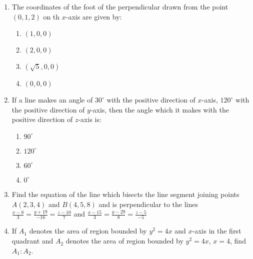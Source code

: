 \documentclass{article}
\begin{document}
\begin{enumerate}
	\item The coordinates of the foot of the perpendicular drawn from the point $(0,1,2)$ on th $x$-axis are given by:
		\begin{enumerate}
			\item $(1,0,0)$
			\item $(2,0,0)$
			\item $(\sqrt{5},0,0)$
			\item $(0,0,0)$
		\end{enumerate}
	\item If a line makes an angle of $30^{\circ}$ with the positive direction of $x$-axis, $120^{\circ}$ with the positive direction of $y$-axis, then the angle which it makes with the positive direction of $z$-axis is:
		\begin{enumerate}
			\item $90^{\circ}$
			\item $120^{\circ}$
			\item $60^{\circ}$
			\item $0^{\circ}$
		\end{enumerate}
	\item Find the equation of the line which bisects the line segment joining points $A(2,3,4)$ and $B(4,5,8)$ and is perpendicular to the lines $\frac{x-8}{3} = \frac{y+19}{-16} = \frac{z-10}{7}$ and $\frac{x-15}{3} = \frac{y-29}{8} = \frac{z-5}{-5}$
	\item If $A_{1}$ denotes the area of region bounded by $y^{2} = 4x$ and $x$-axis in the first quadrant and $A_{2}$ denotes the area of region bounded by $y^{2} = 4x$, $x=4$, find $A_{1} : A_{2}$.
\end{enumerate}
\end{document}
